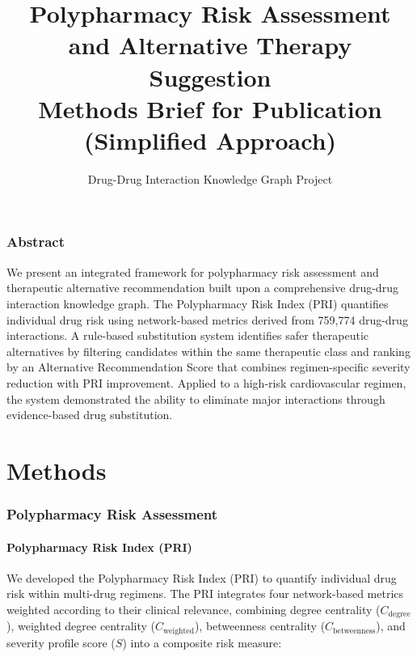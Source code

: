 \documentclass[11pt,a4paper]{article}
\title{\textbf{Polypharmacy Risk Assessment and Alternative Therapy Suggestion}\\
\large Methods Brief for Publication (Simplified Approach)}
\author{Drug-Drug Interaction Knowledge Graph Project}
\date{}
\begin{document}
\maketitle

\section*{Abstract}

We present an integrated framework for polypharmacy risk assessment and therapeutic alternative recommendation built upon a comprehensive drug-drug interaction knowledge graph. The Polypharmacy Risk Index (PRI) quantifies individual drug risk using network-based metrics derived from 759,774 drug-drug interactions. A rule-based substitution system identifies safer therapeutic alternatives by filtering candidates within the same therapeutic class and ranking by an Alternative Recommendation Score that combines regimen-specific severity reduction with PRI improvement. Applied to a high-risk cardiovascular regimen, the system demonstrated the ability to eliminate major interactions through evidence-based drug substitution.

\tableofcontents
\newpage


\part{Methods}

\section{Polypharmacy Risk Assessment}

\subsection{Polypharmacy Risk Index (PRI)}

We developed the Polypharmacy Risk Index (PRI) to quantify individual drug risk within multi-drug regimens. The PRI integrates four network-based metrics weighted according to their clinical relevance, combining degree centrality ($C_{\text{degree}}$), weighted degree centrality ($C_{\text{weighted}}$), betweenness centrality ($C_{\text{betweenness}}$), and severity profile score ($S$) into a composite risk measure:
\end{document}
